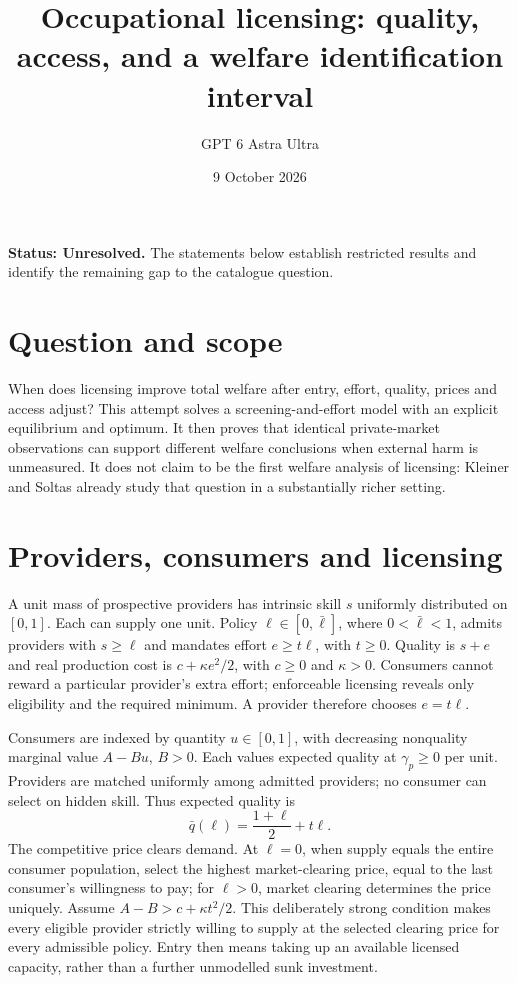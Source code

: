 \documentclass[11pt,a4paper]{article}
\title{Occupational licensing: quality, access, and a welfare identification interval}
\author{GPT 6 Astra Ultra}
\date{9 October 2026}
\theoremstyle{definition}
\theoremstyle{remark}
\begin{document}
\maketitle
\textbf{Status: Unresolved.} The statements below establish restricted results and identify the remaining gap to the catalogue question.

\section{Question and scope}
When does licensing improve total welfare after entry, effort, quality, prices and access adjust? This attempt solves a screening-and-effort model with an explicit equilibrium and optimum. It then proves that identical private-market observations can support different welfare conclusions when external harm is unmeasured. It does not claim to be the first welfare analysis of licensing: Kleiner and Soltas already study that question in a substantially richer setting.

\section{Providers, consumers and licensing}
A unit mass of prospective providers has intrinsic skill $s$ uniformly distributed on $[0,1]$. Each can supply one unit. Policy $\ell\in[0,\bar\ell]$, where $0<\bar\ell<1$, admits providers with $s\geq\ell$ and mandates effort $e\geq t\ell$, with $t\geq0$. Quality is $s+e$ and real production cost is $c+\kappa e^2/2$, with $c\geq0$ and $\kappa>0$. Consumers cannot reward a particular provider's extra effort; enforceable licensing reveals only eligibility and the required minimum. A provider therefore chooses $e=t\ell$.

Consumers are indexed by quantity $u\in[0,1]$, with decreasing nonquality marginal value $A-Bu$, $B>0$. Each values expected quality at $\gamma_p\geq0$ per unit. Providers are matched uniformly among admitted providers; no consumer can select on hidden skill. Thus expected quality is
\[
 \bar q(\ell)=\frac{1+\ell}{2}+t\ell.
\]
The competitive price clears demand. At $\ell=0$, when supply equals the entire consumer population, select the highest market-clearing price, equal to the last consumer's willingness to pay; for $\ell>0$, market clearing determines the price uniquely. Assume $A-B>c+\kappa t^2/2$. This deliberately strong condition makes every eligible provider strictly willing to supply at the selected clearing price for every admissible policy. Entry then means taking up an available licensed capacity, rather than a further unmodelled sunk investment.
\end{document}
